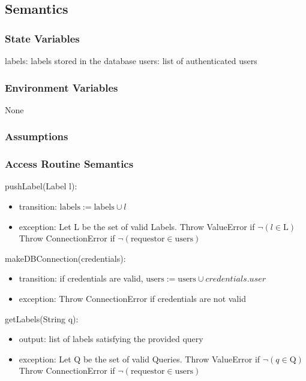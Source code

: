 \documentclass[12pt, titlepage]{article}
\begin{document}
  \subsection{Semantics}
  
  \subsubsection{State Variables}
  
  labels: labels stored in the database
  users: list of authenticated users
  
  \subsubsection{Environment Variables}
  
  None
  
  \subsubsection{Assumptions}
  
  
  \subsubsection{Access Routine Semantics}
  
  \noindent pushLabel(Label l):
  \begin{itemize}
  \item transition: $\text{labels} := \text{labels} \cup l $
  \item exception: Let L be the set of valid Labels. Throw ValueError if $\neg (l \in \text{L})$\\
  Throw ConnectionError if $\neg (\text{requestor} \in \text{users})$
  \end{itemize}

  \noindent makeDBConnection(credentials):
  \begin{itemize}
  \item transition: if credentials are valid, $\text{users} := \text{users} \cup credentials.user $
  \item exception: Throw ConnectionError if credentials are not valid
  \end{itemize}

  \noindent getLabels(String q):
  \begin{itemize}
  \item output: list of labels satisfying the provided query
  \item exception: Let Q be the set of valid Queries. Throw ValueError if $\neg (q \in \text{Q})$\\
  Throw ConnectionError if $\neg (\text{requestor} \in \text{users})$

  \end{itemize}
  
\end{document}
